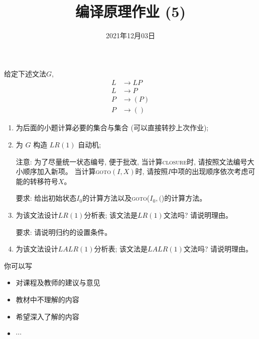 \documentclass[a4paper, justified]{tufte-handout}
\title{编译原理作业 (5)}
\date{2021年12月03日}
\begin{document}
\maketitle
\noplagiarism %
\begin{abstract}
\end{abstract}
\beginrequired

\begin{problem}[\score{10 = 1 + 4 + 2 + 3}]
  给定下述文法$G$,
  \begin{align}
    L &\to LP \\[8pt]
    L &\to P \\[8pt]
    P &\to (P) \\[8pt]
    P &\to ()
  \end{align}

  \begin{enumerate}[(1)]
    \item 为后面的小题计算必要的\first{}集合与\follow{}集合 (可以直接转抄上次作业);
    \item 为 $G$ 构造 $LR(1)$ 自动机;

      注意: 为了尽量统一状态编号, 便于批改, 当计算\textsc{closure}时, 请按照文法编号大小顺序加入新项。
      当计算\textsc{goto}$(I, X)$时, 请按照$I$中项的出现顺序依次考虑可能的转移符号$X$。

      要求: 给出初始状态$I_{0}$的计算方法以及\textsc{goto}($I_{0}, ($)的计算方法。
    \item 为该文法设计$LR(1)$分析表; 该文法是$LR(1)$文法吗? 请说明理由。

      要求: 请说明归约的设置条件。
    \item 为该文法设计$LALR(1)$分析表; 该文法是$LALR(1)$文法吗? 请说明理由。
  \end{enumerate}
\end{problem}

\begin{solution}
\end{solution}



\beginfb

你可以写
\begin{itemize}
  \item 对课程及教师的建议与意见
  \item 教材中不理解的内容
  \item 希望深入了解的内容
  \item $\cdots$
\end{itemize}
\end{document}
